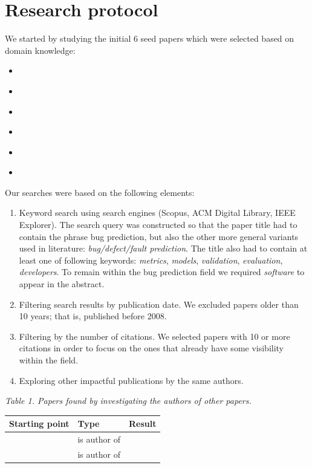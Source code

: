\documentclass[]{book}
\providecommand{\tightlist}{%
  \setlength{\itemsep}{0pt}\setlength{\parskip}{0pt}}
\begin{document}
\section{Research protocol}\label{research-protocol-2}

We started by studying the initial 6 seed papers which were selected
based on domain knowledge:

\begin{itemize}
\tightlist
\item
  \citet{Gyimothy2005}
\item
  \citet{Catal2009review}
\item
  \citet{Arisholm2010}
\item
  \citet{DAmbros2010}
\item
  \citet{Hall2012}
\item
  \citet{Lewis2013}
\end{itemize}

Our searches were based on the following elements:

\begin{enumerate}
\def\labelenumi{\arabic{enumi}.}
\item
  Keyword search using search engines (Scopus, ACM Digital Library, IEEE
  Explorer). The search query was constructed so that the paper title
  had to contain the phrase bug prediction, but also the other more
  general variants used in literature: \emph{bug/defect/fault
  prediction}. The title also had to contain at least one of following
  keywords: \emph{metrics}, \emph{models}, \emph{validation},
  \emph{evaluation}, \emph{developers}. To remain within the bug
  prediction field we required \emph{software} to appear in the
  abstract.
\item
  Filtering search results by publication date. We excluded papers older
  than 10 years; that is, published before 2008.
\item
  Filtering by the number of citations. We selected papers with 10 or
  more citations in order to focus on the ones that already have some
  visibility within the field.
\item
  Exploring other impactful publications by the same authors.
\end{enumerate}

\emph{Table 1. Papers found by investigating the authors of other
papers.}

\begin{longtable}[]{@{}lll@{}}
\toprule
Starting point & Type & Result\tabularnewline
\midrule
\endhead
\citet{DAmbros2010} & is author of & \citet{DAmbros2012}\tabularnewline
\citet{Catal2009review} & is author of & \citet{Catal2011}
\citet{Catal2009investigating}\tabularnewline
\bottomrule
\end{longtable}
\end{document}
